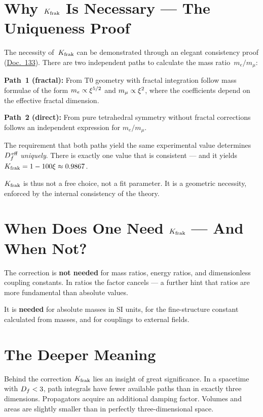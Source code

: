 \section{Why $K_{\text{frak}}$ Is Necessary --- The Uniqueness Proof}

The necessity of~$K_{\text{frak}}$ can be demonstrated through an elegant consistency proof (\href{https://github.com/jpascher/T0-Time-Mass-Duality/blob/main/2/pdf/133_Fraktale_Korrektur_Herleitung_De.pdf}{Doc.~133}). There are two independent paths to calculate the mass ratio~$m_e/m_\mu$:

\textbf{Path~1 (fractal):} From T0 geometry with fractal integration follow mass formulae of the form $m_e \propto \xi^{5/2}$ and $m_\mu \propto \xi^2$, where the coefficients depend on the effective fractal dimension.

\textbf{Path~2 (direct):} From pure tetrahedral symmetry without fractal corrections follows an independent expression for $m_e/m_\mu$.

The requirement that both paths yield the same experimental value determines~$D_f^{\,\text{eff}}$ \emph{uniquely}. There is exactly one value that is consistent --- and it yields $K_{\text{frak}} = 1 - 100\xi \approx 0.9867$.

$K_{\text{frak}}$ is thus not a free choice, not a fit parameter. It is a geometric necessity, enforced by the internal consistency of the theory.

\section{When Does One Need $K_{\text{frak}}$ --- And When Not?}

The correction is \textbf{not needed} for mass ratios, energy ratios, and dimensionless coupling constants. In ratios the factor cancels --- a further hint that ratios are more fundamental than absolute values.

It is \textbf{needed} for absolute masses in SI units, for the fine-structure constant calculated from masses, and for couplings to external fields.

\section{The Deeper Meaning}

Behind the correction $K_{\text{frak}}$ lies an insight of great significance. In a spacetime with $D_f < 3$, path integrals have fewer available paths than in exactly three dimensions. Propagators acquire an additional damping factor. Volumes and areas are slightly smaller than in perfectly three-dimensional space.

